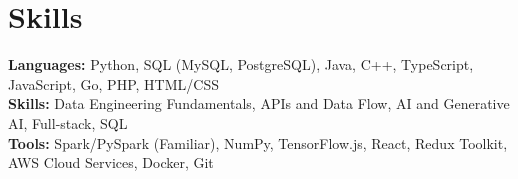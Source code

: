 \documentclass[11pt]{article}       %
\begin{document}

\vspace{-18.5pt}


\section*{Skills}
\textbf{Languages:} Python, SQL (MySQL, PostgreSQL), Java, C++, TypeScript, JavaScript, Go, PHP, HTML/CSS\\
\textbf{Skills:} Data Engineering Fundamentals, APIs and Data Flow, AI and Generative AI, Full-stack, SQL\\
\textbf{Tools:} Spark/PySpark (Familiar), NumPy, TensorFlow.js, React, Redux Toolkit, AWS Cloud Services, Docker, Git\\

\vspace{-6.5pt}
\end{document}
